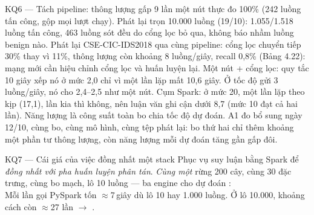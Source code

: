 \documentclass[aspectratio=169, 11pt]{beamer}
\begin{document}
\begin{frame}{KQ6 --- Tách pipeline: thông lượng gấp 9 lần một nút}
{  thực đo 100\% (242 luồng tấn công, gộp mọi lượt chạy). Phát lại trọn 10.000 luồng (19/10): 1.055/1.518 luồng tấn công, 463 luồng sót đều do cổng lọc bỏ qua, không báo nhầm luồng benign nào. Phát lại CSE-CIC-IDS2018 qua cùng pipeline: cổng lọc chuyển tiếp 30\% thay vì 11\%, thông lượng còn khoảng 8 luồng/giây, recall 0,8\% (Bảng 4.22): mạng mới cần hiệu chỉnh cổng lọc và huấn luyện lại. Một nút + cổng lọc: quy tắc 10 giây xếp nó ở mức 2,0 chỉ vì một lần lặp mất 10,6 giây. Ở tốc độ gửi 3 luồng/giây, nó cho 2,4--2,5 như một nút. Cụm Spark: ở mức 20, một lần lặp theo kịp (17,1), lần kia thì không, nên luận văn ghi cận dưới 8,7 (mức 10 đạt cả hai lần). Năng lượng là công suất toàn bo chia tốc
  độ dự đoán. A1 đo bổ sung ngày 12/10, cùng bo, cùng mô hình, cùng tệp phát lại:
  bo thứ hai chỉ thêm khoảng một phần tư thông lượng, còn năng lượng mỗi dự đoán
  tăng gần gấp đôi.}
\end{frame}


\begin{frame}{KQ7 --- Cái giá của việc đồng nhất một stack}
  Phục vụ suy luận bằng Spark để \emph{đồng nhất với pha huấn luyện phân tán}.
  \emph{Cùng một} rừng 200 cây, cùng 30 đặc trưng, cùng bo mạch, lô 10 luồng ---
  ba engine cho dự đoán :
  \vspace{0.6em}
  \centering\small
  \\[0.2em]{\scriptsize Mỗi lần gọi PySpark tốn $\approx$7\,giây dù lô 10 hay
  1.000 luồng. Ở lô 10.000, khoảng cách còn $\approx$27 lần
  $\rightarrow$ \hyperlink{bk-batch}{}.}
\end{frame}
\end{document}

